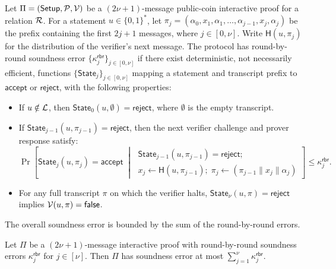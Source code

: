 \begin{definition}
\label{def:roundByRoundSoundness}
Let $\Pi=({\sf Setup},\mathcal{P},\mathcal{V})$ be a $(2\nu+1)$-message
public-coin interactive proof for a relation $\mathcal{R}$.
For a statement $u\in\{0,1\}^*$, let
$\pi_j=(\alpha_0,x_1,\alpha_1,\ldots,\alpha_{j-1},x_j,\alpha_j)$
be the prefix containing the first $2j+1$ messages, where
$j\in[0,\nu]$. Write $\mathsf H(u,\pi_j)$ for the
distribution of the verifier's next message.
The protocol has round-by-round soundness error
$\{\kappa_j^\mathsf{rbr}\}_{j\in[0,\nu]}$ if there exist
deterministic, not necessarily efficient, functions
$\{\mathsf{State}_j\}_{j\in[0,\nu]}$ mapping a statement and
transcript prefix to $\mathsf{accept}$ or $\mathsf{reject}$,
with the following properties:
\begin{itemize}
    \item If $u\notin\mathcal{L}$, then
    $\mathsf{State}_0(u,\emptyset)=\mathsf{reject}$, where
    $\emptyset$ is the empty transcript.
    \item If $\mathsf{State}_{j-1}(u,\pi_{j-1})=\mathsf{reject}$,
    then the next verifier challenge and prover response satisfy:
    \[
        \Pr\left[
            \mathsf{State}_j(u,\pi_j)=\mathsf{accept}
            \;\middle|\;
            \begin{gathered}
                \mathsf{State}_{j-1}(u,\pi_{j-1})=\mathsf{reject};\\
                x_j\leftarrow\mathsf H(u,\pi_{j-1});\;
                \pi_j\leftarrow(\pi_{j-1}\|x_j\|\alpha_j)
            \end{gathered}
        \right]
        \leq\kappa_j^\mathsf{rbr}.
    \]
    \item For any full transcript $\pi$ on which the verifier halts,
    $\mathsf{State}_\nu(u,\pi)=\mathsf{reject}$ implies
    $\mathcal{V}(u,\pi)={\sf false}$.
\end{itemize}
\end{definition}

The overall soundness error is bounded by the sum of the
round-by-round errors.
\begin{lemma}
\label{lemma:rbr}
Let $\Pi$ be a $(2\nu+1)$-message interactive proof with
round-by-round soundness errors $\kappa_j^\mathsf{rbr}$ for $j\in[\nu]$.
Then $\Pi$ has soundness error at most
$\sum_{j=1}^\nu\kappa_j^\mathsf{rbr}$.
\end{lemma}
